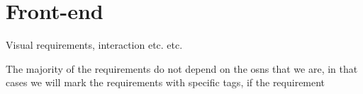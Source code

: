 %
%
%
%
%
%
%

%




\section{Front-end}
Visual requirements, interaction etc. etc.

The majority of the requirements do not depend on the \glspl{osn} that we are, in that cases we will mark the requirements with specific tags, if the requirement


